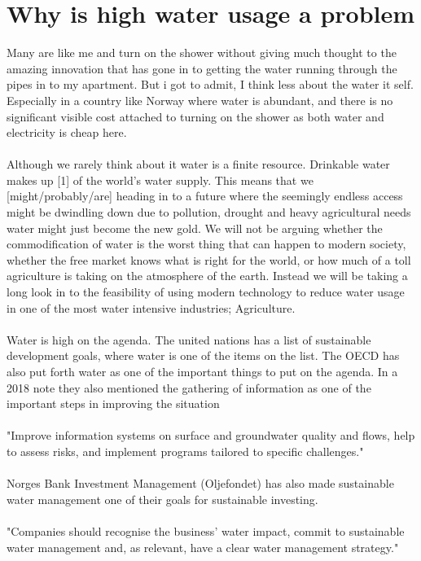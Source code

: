 \documentclass[]{uiophd}
\begin{document}
\section{Why is high water usage a problem}
Many are like me and turn on the shower without giving much thought to the amazing innovation that has gone in to getting the water running through the pipes in to my apartment. But i got to admit, I think less about the water it self. Especially in a country like Norway where water is abundant, and there is no significant visible cost attached to turning on the shower as both water and electricity is cheap here.
\\\\
Although we rarely think about it water is a finite resource. Drinkable water makes up [1] of the world's water supply. This means that we [might/probably/are] heading in to a future where the seemingly endless access might be dwindling down due to pollution, drought and heavy agricultural needs water might just become the new gold. We will not be arguing whether the commodification of water is the worst thing that can happen to modern society, whether the free market knows what is right for the world, or how much of a toll agriculture is taking on the atmosphere of the earth. Instead we will be taking a long look in to the feasibility of using modern technology to reduce water usage in one of the most water intensive industries; Agriculture.
\\\\
Water is high on the agenda. The united nations has a list of sustainable development goals, where water is one of the items on the list. The OECD has also put forth water as one of the important things to put on the agenda. In a 2018 note they also mentioned the gathering of information as one of the important steps in improving the situation 
\\\\
"Improve information systems on surface and groundwater quality and flows, help to assess risks, and implement programs tailored to specific challenges."
\\\\
Norges Bank Investment Management (Oljefondet) has also made sustainable water management one of their goals for sustainable investing. 
\\\\
"Companies should recognise the business’
water impact, commit to sustainable water
management and, as relevant, have a clear
water management strategy."
\end{document}
